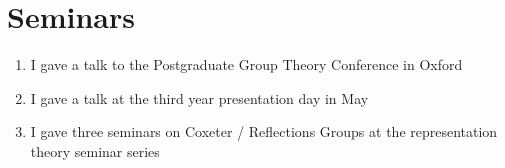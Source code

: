 \documentclass[12pt]{article}
\begin{document}
\section{Seminars}

\begin{enumerate}
\item I gave a talk to the Postgraduate Group Theory Conference in Oxford
\item I gave a talk at the third year presentation day in May
\item I gave three seminars on Coxeter / Reflections Groups at the representation theory seminar series
\end{enumerate}
\end{document}
